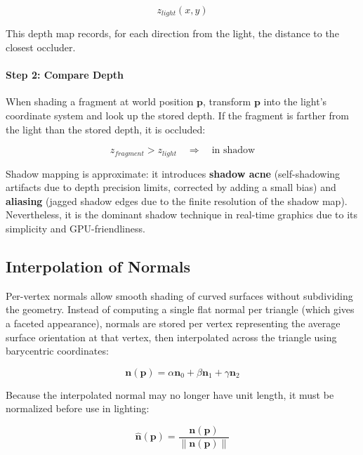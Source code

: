 \documentclass[11pt]{article}
\begin{document}
\begin{equation}
    z_{light}(x,y)
\end{equation}

This depth map records, for each direction from the light, the distance to the closest occluder.

\paragraph{Step 2: Compare Depth}

When shading a fragment at world position $\mathbf{p}$, transform $\mathbf{p}$ into the light's coordinate system and look up the stored depth. If the fragment is farther from the light than the stored depth, it is occluded:

\begin{equation}
    z_{fragment} > z_{light}
    \quad \Rightarrow \quad
    \text{in shadow}
\end{equation}

Shadow mapping is approximate: it introduces \textbf{shadow acne} (self-shadowing artifacts due to depth precision limits, corrected by adding a small bias) and \textbf{aliasing} (jagged shadow edges due to the finite resolution of the shadow map). Nevertheless, it is the dominant shadow technique in real-time graphics due to its simplicity and GPU-friendliness.


\subsection{Interpolation of Normals}

Per-vertex normals allow smooth shading of curved surfaces without subdividing the geometry. Instead of computing a single flat normal per triangle (which gives a faceted appearance), normals are stored per vertex representing the average surface orientation at that vertex, then interpolated across the triangle using barycentric coordinates:

\begin{equation}
    \mathbf{n}(\mathbf{p}) =
    \alpha \mathbf{n}_0 + \beta \mathbf{n}_1 + \gamma \mathbf{n}_2
\end{equation}

Because the interpolated normal may no longer have unit length, it must be normalized before use in lighting:

\begin{equation}
    \hat{\mathbf{n}}(\mathbf{p}) =
    \frac{\mathbf{n}(\mathbf{p})}{\|\mathbf{n}(\mathbf{p})\|}
\end{equation}
\end{document}
